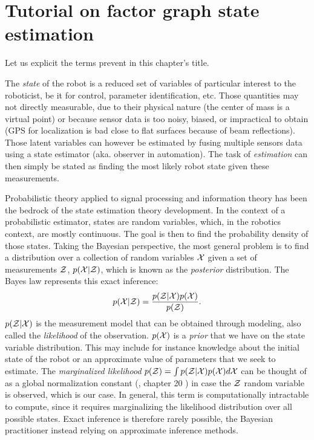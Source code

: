 \chapter{Tutorial on factor graph state estimation}
\minitoc

Let us explicit the terms prevent in this chapter's title. 

The \textit{state} of the robot is a reduced set of variables of particular interest to the roboticist, be it for control, parameter identification, etc.
Those quantities may not directly measurable, due to their physical nature (the center of mass is a virtual point) or because sensor data
is too noisy, biased, or impractical to obtain (\eg GPS for localization is bad close to flat surfaces because of beam reflections). 
Those latent variables can however be estimated by fusing multiple sensors data using a state estimator (aka. observer in automation). 
The task of \textit{estimation} can then simply be stated as finding the most likely robot state given these measurements. 

Probabilistic theory applied to signal processing and information theory has been the bedrock of the state estimation theory development.
In the context of a probabilistic estimator, states are random variables, which, in the robotics context, are mostly continuous. 
The goal is then to find the probability density of those states.
Taking the Bayesian perspective, the most general problem is to find a distribution over a collection of random variables $\mathcal{X}$ given a set 
of measurements $\mathcal{Z}$, $p(\mathcal{X} | \mathcal{Z})$, which is known as the \textit{posterior} distribution. 
The Bayes law represents this exact inference:
%
\begin{equation}
    p(\mathcal{X} | \mathcal{Z}) = \frac{p(\mathcal{Z} | \mathcal{X}) p(\mathcal{X})}{p(\mathcal{Z})}.
\end{equation}
%
$p(\mathcal{Z} | \mathcal{X})$ is the measurement model that can be obtained through modeling, also called the \textit{likelihood} of the observation. 
$p(\mathcal{X})$ is a \textit{prior} that we have on the state variable distribution. This may include for instance knowledge about the initial state of the robot or
an approximate value of parameters that we seek to estimate.
The \textit{marginalized likelihood} $p(\mathcal{Z}) = \int p(\mathcal{Z}|\mathcal{X})p(\mathcal{X})d\mathcal{X} $ can be thought of as a global normalization constant (\cite{koller2009probabilistic}, chapter 20 ) in case 
the $\mathcal{Z}$ random variable is observed, which is our case. In general, this term is computationally intractable to compute, since it requires marginalizing
the likelihood distribution over all possible states. Exact inference is therefore rarely possible, the Bayesian practitioner instead relying on approximate inference methods.

